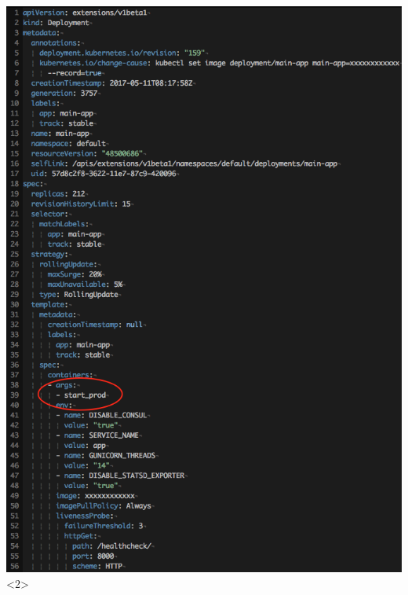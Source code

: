 \documentclass[12pt]{beamer}
\begin{document}
\begin{frame}
\begin{columns}
\begin{center}
                \includegraphics[width=1\textwidth]{images/kubernetes-config-command.png}<2>

\end{center}
\end{columns}
\end{frame}
\end{document}
